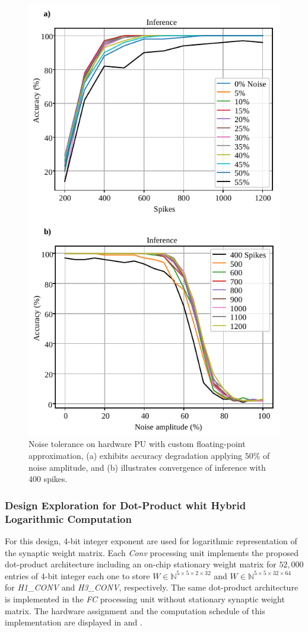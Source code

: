 \begin{figure}[b!]
	\centering
	\includegraphics[width=0.5\columnwidth]{./chapters/sbs_accelerator/figures/accuracy_vs_noise_pu_cfp(4-bit-exponent_1-bit-mantissa).pdf}
	\caption{Noise tolerance on hardware PU with custom floating-point approximation, (a) exhibits accuracy degradation applying $50\%$ of noise amplitude, and (b) illustrates convergence of inference with $400$ spikes.}
	\label{fig:accuracy_vs_noise_pu_cfp}
\end{figure}

\subsubsection{Design Exploration for Dot-Product whit Hybrid Logarithmic Computation}
For this design, 4-bit integer exponent are used for logarithmic representation of the synaptic weight matrix. Each \emph{Conv} processing unit implements the proposed dot-product architecture including an on-chip stationary weight matrix for $52,000$ entries of 4-bit integer each one to store $W\in\mathbb{N}^{5\times 5\times 2\times 32}$ and $W\in\mathbb{N}^{5\times 5\times 32\times 64}$ for \emph{H1\_CONV} and \emph{H3\_CONV}, respectively. The same dot-product architecture is implemented in the \emph{FC} processing unit without stationary synaptic weight matrix. The hardware assignment and the computation schedule of this implementation are displayed in  and .

